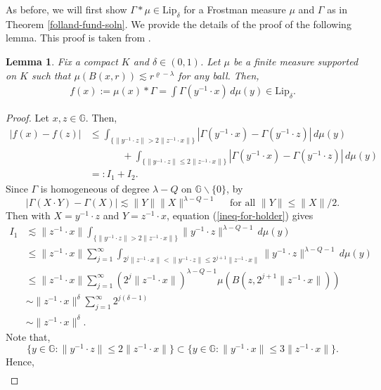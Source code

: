 \documentclass[12pt,a4paper,reqno]{amsart}
\newcommand{\cg}{\Gamma}
\renewcommand{\l}{\lambda}
\newcommand{\G}{\mathbb{G}}
\numberwithin{equation}{section}
\newtheorem{lem}[thm]{Lemma}
\theoremstyle{definition}
\begin{document}
As before, we will first show $\cg \ast \mu \in \text{Lip}_{\delta}$ for a Frostman measure $\mu$ and $\cg$ as in Theorem \ref{folland-fund-soln}. We provide the details of the proof of the following lemma. This proof is taken from \cite[Theorem 4.12]{CT}.
\begin{lem}
Fix a compact $K$ and $\delta \in (0,1)$. Let $\mu$ be a finite measure supported on $K$ such that $\mu(B(x,r)) \lesssim r^{\varrho - \l}$ for any ball. Then, \begin{align*}
    f(x) :=  \mu(x) \ast \cg = \int \cg(y^{-1}\cdot x)\, d\mu(y) \in \text{Lip}_{\delta}.
\end{align*}
\end{lem}
\begin{proof}
    Let $x,z \in \G$. Then, \begin{align*}
         |f(x) -f(z)| &\leq \int_{ \{ \| y^{-1} \cdot z\| > 2\|z^{-1} \cdot x\|\}} |\cg(y^{-1} \cdot x) - \cg(y^{-1} \cdot z)|\,d\mu(y) \\ &\,\,\,\,\,\,\,\,\,\,\,\,\,\,\,\,\,\,\,\,+ \int_{ \{ \| y^{-1} \cdot z\| \leq 2\|z^{-1} \cdot x\|\}} |\cg(y^{-1} \cdot x) - \cg(y^{-1} \cdot z)|\,d\mu(y) \\ &=: I_1 + I_2.
     \end{align*}
Since $\cg$ is homogeneous of degree $\l-Q$ on $\G \backslash \{0\}$, by \cite[Proposition 3.1.40]{FR} \begin{equation}\label{ineq-for-holder}
|\cg(X \cdot Y) - \cg(X)| \lesssim \| Y\| \| X\|^{\l-Q-1} \quad \text{ for all }\| Y\| \leq \|X\|/2.
\end{equation}
Then with $X = y^{-1} \cdot z$ and $Y = z^{-1} \cdot x$, equation (\ref{ineq-for-holder}) gives \begin{align*}
    I_1 &\lesssim \| z^{-1} \cdot x\| \int_{\{ \| y^{-1} \cdot z\| > 2\|z^{-1} \cdot x\|\}} \|y^{-1} \cdot z\|^{\l - Q -1}\,d\mu(y) \\ &\leq \| z^{-1} \cdot x\| \sum_{j=1}^{\infty} \int_{2^j \|z^{-1} \cdot x\| < \| y^{-1} \cdot z\| \leq 2^{j+1}\|z^{-1} \cdot x\|} \| y^{-1} \cdot z\|^{\l - Q-1}\,d\mu(y) \\ &\leq \| z^{-1} \cdot x\| \sum_{j=1}^{\infty} (2^j \| z^{-1} \cdot x\|)^{\l - Q -1} \mu(B(z, 2^{j+1}\|z^{-1} \cdot x\|)) \\ &\sim \| z^{-1} \cdot x\|^{\delta} \sum_{j=1}^{\infty} 2^{j(\delta - 1)} \\ &\sim \|z^{-1} \cdot x\|^{\delta}.
\end{align*}
Note that, $$\{ y \in \G : \| y^{-1} \cdot z\| \leq 2\|z^{-1} \cdot x\|\} \subset \{y \in \G : \| y^{-1} \cdot x\| \leq 3\| z^{-1} \cdot x\|\}.$$ Hence, \begin{align*}

\end{align*}
\end{proof}
\end{document}
